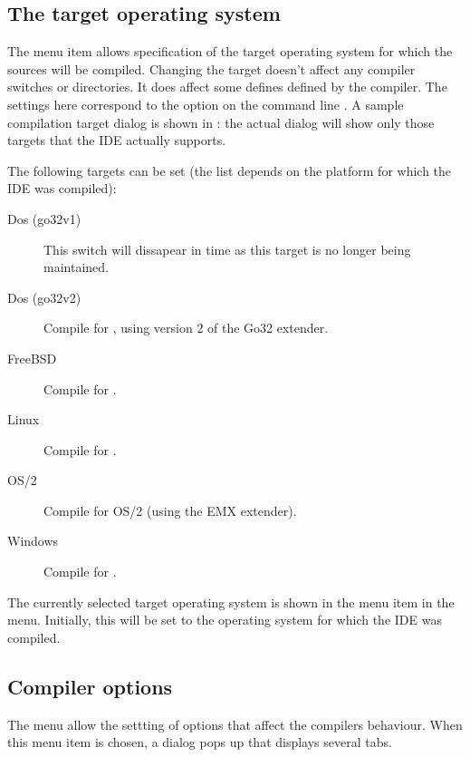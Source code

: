 \subsection{The target operating system}
The menu item  allows  specification of the target
operating system for which the sources will be compiled.
Changing the target doesn't affect any compiler switches or
directories. It does affect some defines defined by the compiler.
The settings here correspond to the option on the command line 
. A sample compilation target dialog is shown in :
the actual dialog will show only those targets that the IDE actually 
supports.


The following targets can be set (the list depends on the platform for
which the IDE was compiled):
\begin{description}
\item[Dos (go32v1)] This switch will dissapear in time as this target is no
longer being maintained.
\item[Dos (go32v2)] Compile for \dos, using version 2 of the Go32 extender.
\item[FreeBSD] Compile for \freebsd.
\item[Linux] Compile for \linux.
\item[OS/2] Compile for OS/2 (using the EMX extender).
\item[Windows] Compile for \windows.
\end{description}
The currently selected target operating system is shown in the 
 menu item in the  menu. Initially, 
this will be set to the operating system for which the IDE was compiled.
%
%
\subsection{Compiler options}
The menu  allow the settting of options that affect the
compilers behaviour. When this menu item is chosen, a dialog pops up that
displays several tabs.

